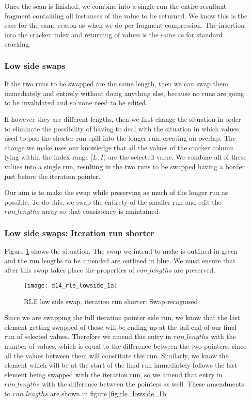 Once the scan is finished, we combine into a single run the entire resultant fragment containing all instances of the value to be returned. We know this is the case for the same reason as when we do per-fragment compression. The insertion into the cracker index and returning of values is the same as for standard cracking.

\subsubsection{Low side swaps}

If the two runs to be swapped are the same length, then we can swap them immediately and entirely without doing anything else, because no runs are going to be invalidated and so none need to be edited.

If however they are different lengths, then we first change the situation in order to eliminate the possibility of having to deal with the situation in which values used to pad the shorter run spill into the longer run, creating an overlap. The change we make uses our knowledge that all the values of the cracker column lying within the index range $[L, I)$ are the selected value. We combine all of these values into a single run, resulting in the two runs to be swapped having a border just before the iteration pointer.

Our aim is to make the swap while preserving as much of the longer run as possible. To do this, we swap the entirety of the smaller run and edit the $run\_lengths$ array so that consistency is maintained.

\subsubsection{Low side swaps: Iteration run shorter}

Figure \ref{fig:rle_lowside_1a} shows the situation. The swap we intend to make is outlined in green and the run lengths to be amended are outlined in blue. We must ensure that after this swap takes place the properties of $run\_lengths$ are preserved.

\begin{figure}[H]
  \centering
  \texttt{[image: d14\_rle\_lowside\_1a]}
  \caption{RLE low side swap, iteration run shorter: Swap recognised}
  \label{fig:rle_lowside_1a}
\end{figure}

Since we are swapping the full iteration pointer side run, we know that the last element getting swapped of those will be ending up at the tail end of our final run of selected values. Therefore we amend this entry in $run\_lengths$ with the number of values, which is equal to the difference between the two pointers, since all the values between them will constitute this run. Similarly, we know the element which will be at the start of the final run immediately follows the last element being swapped with the iteration run, so we amend that entry in $run\_lengths$ with the difference between the pointers as well. These amendments to $run\_lengths$ are shown in figure \ref{fig:rle_lowside_1b}.

